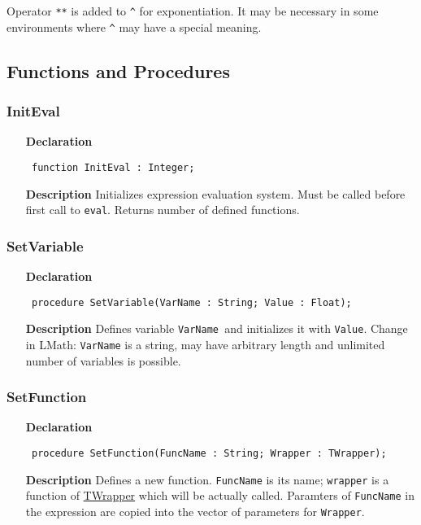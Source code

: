 \documentclass[12pt,a4paper,oneside]{report}
\newcommand{\lmath}[1]{   %
	\marginpar{\vspace{#1} 
		\begin{flushright}
			LMath
	\end{flushright} }
}
\newcommand{\declarationitem}[1]{\textbf{#1}}
\newcommand{\descriptiontitle}[1]{\textbf{#1}}
\newcommand{\code}[1]{\texttt{#1}}
\begin{document}
Operator \code{**} is added to \code{\^} for exponentiation. It may be necessary in some environments where \code{\^} may have a special meaning.

\subsection{Functions and Procedures}
\subsubsection{InitEval}
\label{ueval-InitEval}
\begin{itemize}\item[\declarationitem{Declaration}\hfill]
	\begin{flushleft}
		\code{
			function InitEval : Integer;}
	\end{flushleft}
	\item[\descriptiontitle{Description}]
Initializes expression evaluation system. Must be called before first call to \code{eval}. Returns number of defined functions. 
\end{itemize}
\subsubsection{SetVariable}
\label{ueval-SetVariable}
 \lmath{-6pt}
\begin{itemize}\item[\declarationitem{Declaration}\hfill]
	\begin{flushleft}
		\code{
			procedure SetVariable(VarName : String; Value : Float);}
	\end{flushleft}
	\item[\descriptiontitle{Description}]
Defines variable \code{VarName }and initializes it with \code{Value}. Change in LMath: \code{VarName} is a string, may have arbitrary length and unlimited number of variables is possible. 
\end{itemize}
\subsubsection{SetFunction}
\label{ueval-SetFunction}
\begin{itemize}\item[\declarationitem{Declaration}\hfill]
	\begin{flushleft}
		\code{
			procedure SetFunction(FuncName : String; Wrapper : TWrapper);}
	\end{flushleft}
	\item[\descriptiontitle{Description}]
Defines a new function. \code{FuncName} is its name; \code{wrapper} is a function of \hyperref[utypes-TWrapper]{TWrapper} which will be actually called. Paramters of \code{FuncName} in the expression are copied into the vector of parameters for \code{Wrapper}. 
\end{itemize}
\end{document}
